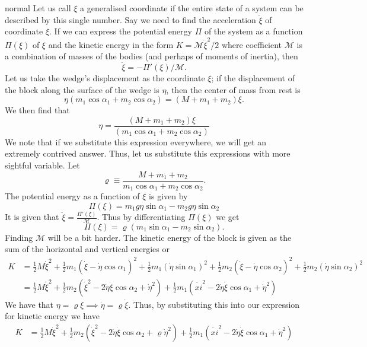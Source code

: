 \begin{solution}{normal}
Let us call $\xi$ a generalised coordinate if the entire state of a system can be described by this single number. Say we need to find the acceleration $\ddot\xi$ of coordinate $\xi$. If we can express the potential energy $\Pi$ of the system as a function $\Pi\left(\xi\right)$ of $\xi$ and the kinetic energy in the form $K=\mathcal{M}\dot\xi^2/2$ where coefficient $\mathcal{M}$ is a combination of masses of the bodies (and perhaps of moments of inertia), then
\[\ddot\xi=-\Pi'\left(\xi\right)/\mathcal{M}.\]Let us take the wedge's displacement as the coordinate $\xi$; if the displacement of the block along the surface of the wedge is $\eta$, then the center of mass from rest is
\[\eta(m_1\cos\alpha_1+m_2\cos\alpha_2)=(M+m_1+m_2)\xi.\]We then find that
\[\eta=\frac{(M+m_1+m_2)\xi}{(m_1\cos\alpha_1+m_2\cos\alpha_2)}\]We note that if we substitute this expression everywhere, we will get an extremely contrived answer. Thus, let us substitute this expressions with more sightful variable. Let
\[\varrho\equiv\frac{M+m_1+m_2}{m_1\cos\alpha_1+m_2\cos\alpha_2}.\]The potential energy as a function of $\xi$ is given by
\[\Pi \left(\xi\right)=m_1 g\eta\sin\alpha_1-m_2 g\eta\sin\alpha_2\]It is given that $\ddot{\xi}=\frac{\Pi' \left(\xi\right)}{\mathcal{M}}$. Thus by differentiating $\Pi\left(\xi\right)$ we get
\[\Pi\left(\xi\right)= \varrho(m_1\sin\alpha_1-m_2\sin\alpha_2).\]Finding $\mathcal{M}$ will be a bit harder. The kinetic energy of the block is given as the sum of the horizontal and vertical energies or
\begin{align*}
K&=\frac{1}{2}M\dot{\xi}^2+\frac{1}{2}m_1(\dot{\xi}-\dot{\eta}\cos\alpha_1)^2+\frac{1}{2}m_1(\dot{\eta}\sin\alpha_1)^2+\frac{1}{2}m_2(\dot{\xi}-\dot{\eta}\cos\alpha_2)^2+\frac{1}{2}m_2(\dot{\eta}\sin\alpha_2)^2\\
&=\frac{1}{2}M\dot{\xi}^2+\frac{1}{2}m_2(\dot{\xi}^2-2\dot\eta\dot\xi\cos\alpha_2+\dot\eta^2)+ \frac{1}{2}m_1(\dot{xi}^2-2\dot\eta\dot\xi\cos\alpha_1+\dot\eta^2)
\end{align*}We have that $\eta=\varrho\xi\implies\dot\eta=\varrho\dot\xi$. Thus, by substituting this into our expression for kinetic energy we have
\begin{align*}
K &=\frac{1}{2}M\dot{\xi}^2+\frac{1}{2}m_2(\dot{\xi}^2-2\dot\eta\dot\xi\cos\alpha_2+\varrho\dot\eta^2)+ \frac{1}{2}m_1(\dot{xi}^2-2\dot\eta\dot\xi\cos\alpha_1+\dot\eta^2) \\

\end{align*}
\end{solution}
